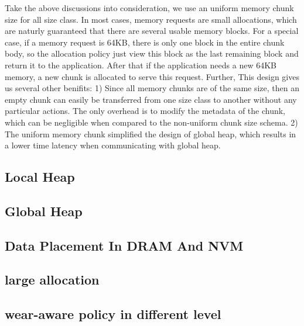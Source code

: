 \documentclass{vldb}
\begin{document}
Take the above discussions into consideration, we use an uniform memory chunk size for all size class. 
In most cases, memory requests are small allocations, which are naturly guaranteed that there are several usable memory blocks. 
For a special case, if a memory request is 64KB, there is only one block in the entire chunk body, so the allocation policy just view this block as the last remaining block and return it to the application. After that if the application needs a new 64KB memory, a new chunk is allocated to serve this request.
Further, This design gives us several other benifits: 
1) Since all memory chunks are of the same size, then an empty chunk can easily be transferred from one size class to another without any particular actions.
The only overhead is to modify the metadata of the chunk, which can be negligible when compared to the non-uniform chunk size schema. 
2) The uniform memory chunk simplified the design of global heap, which results in a lower time latency when communicating with global heap.

\subsection{Local Heap}


\subsection{Global Heap}

\subsection{Data Placement In DRAM And NVM}


\subsection{large allocation}

\subsection{wear-aware policy in different level}

\end{document}
